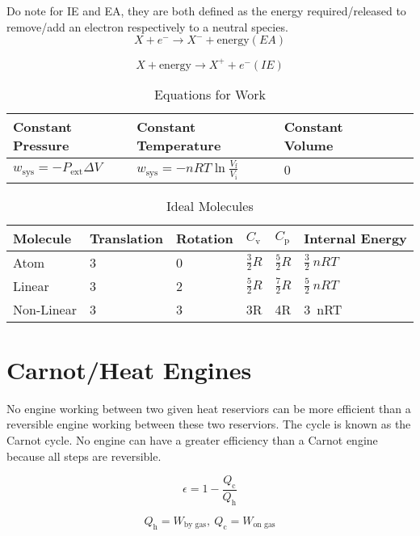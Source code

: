 \documentclass{article}
\begin{document}
Do note for IE and EA, they are both defined as the energy required/released to remove/add an electron respectively to a neutral species.
\[
X + e^- \rightarrow X^- + \text{energy} (EA)
\]

\[
X + \text{energy} \rightarrow X^+ + e^- (IE)
\]



\begin{table}[h]
\centering
\caption{Equations for Work}
\label{my-label}
\def\arraystretch{1.5}
\begin{tabular}{|l|l|l|l|l|}
\hline
Constant Pressure & Constant Temperature & Constant Volume   \\
\hline
$w_\text{sys} = - P_{\text{ext}} \Delta V$   & $w_\text{sys} = - n R T\ln{\frac{V_\text{f}}{V_\text{i}}}$ & 0 \\
\hline
\end{tabular}
\end{table}

\begin{table}[h!]
\centering
\caption{Ideal Molecules}
\label{my-label}
\def\arraystretch{1.5}
\begin{tabular}{|l|l|l|l|l|l|}
\hline
Molecule & Translation & Rotation & $C_\text{v}$ & $C_\text{p}$ & Internal Energy  \\
\hline
Atom & 3 & 0 & $\frac{3}{2}R$ & $\frac{5}{2}R$ & $\frac{3}{2}\ nRT$\\
\hline
Linear & 3 & 2 & $\frac{5}{2}R$& $\frac{7}{2}R$ & $\frac{5}{2}\ nRT$\\
\hline
Non-Linear & 3 & 3 & 3R & 4R & 3\ nRT\\
\hline
\end{tabular}
\end{table}

\section{Carnot/Heat Engines}

No engine working between two given heat reserviors can be more efficient than a reversible engine working between these two reserviors. The cycle is known as the Carnot cycle. No engine can have a greater efficiency than a Carnot engine because all steps are reversible.

\begin{equation*}
\epsilon = 1 - \frac{Q_\text{c}}{Q_\text{h}}
\end{equation*}

\begin{equation*}
Q_\text{h} = W_\text{by gas},\ Q_\text{c} = W_\text{on gas} 
\end{equation*}
\end{document}

